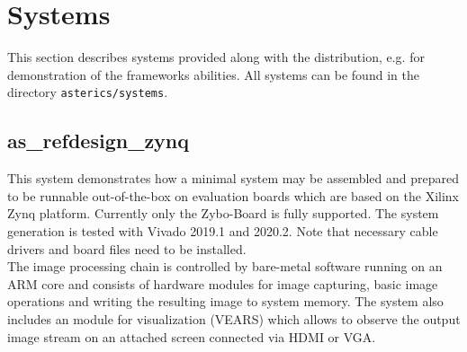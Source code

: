 




\chapter{Systems} \label{ch:09-systems}

This section describes systems provided along with the \asterics distribution, e.g. for demonstration of the \asterics frameworks abilities.
All systems can be found in the directory \texttt{asterics/systems}.


\section{as\_refdesign\_zynq}
\label{sec:09-01-as_refdesign_zybo}


This system demonstrates how a minimal \asterics system may be assembled and prepared to be runnable out-of-the-box on evaluation boards which are based on the Xilinx Zynq platform.
Currently only the Zybo-Board is fully supported. The system generation is tested with Vivado 2019.1 and 2020.2. Note that necessary cable drivers and board files need to be installed.\\
The image processing chain is controlled by bare-metal software running on an ARM core and consists of \asterics hardware modules for image capturing, basic image operations and writing the resulting image to system memory. The system also includes an \asterics module for visualization (VEARS) which allows to observe the output image stream on an attached screen connected via HDMI or VGA.

